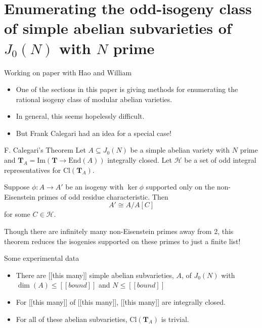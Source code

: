 \documentclass{beamer}
\newcommand{\TT}{\mathbf{T}}
\renewcommand{\H}{\mathcal{H}}
\renewcommand{\Im}{\mathrm{Im}}
\newcommand{\Cl}{\mathrm{Cl}}
\newcommand{\End}{\mathrm{End}}
\begin{document}
\section{Enumerating the odd-isogeny class of simple abelian subvarieties of
$J_0(N)$ with $N$ prime}

\begin{frame}{Working on paper with Hao and William}
    \begin{itemize}
        \item 
            One of the sections in this paper is giving methods for enumerating
            the rational isogeny class of modular abelian varieties. 
        \item
            In general, this seems hopelessly difficult.
        \item
            But Frank Calegari had an idea for a special case!
    \end{itemize} 
\end{frame}

\begin{frame}{F. Calegari's Theorem}
    Let $A\subseteq J_0(N)$ be a simple abelian variety with $N$ prime and
    $\TT_A = \Im(\TT\to \End(A))$ integrally closed. Let $\H$ be a set of
    odd integral representatives for $\Cl(\TT_A)$.
    \begin{theorem}[F. Calegari]
        Suppose $\phi:A\to A'$ be an isogeny with $\ker\phi$ supported only on the
        non-Eisenstein primes of odd residue characteristic. Then
        \[
            A'\cong A/A[C]
        \]
        for some $C\in \H$.
    \end{theorem}
    Though there are infinitely many non-Eisenstein primes away from 2, this
    theorem reduces the isogenies supported on these primes to just a finite
    list!
\end{frame}

\begin{frame}{Some experimental data}
    \begin{itemize}
        \item 
            There are [[this many]] simple abelian subvarieties, $A$, of
            $J_0(N)$ with $\dim(A)\leq [[bound]]$ and $N\leq [[bound]]$
        \item
            For [[this many]] of [[this many]], [[this many]] are integrally
            closed.
        \item
            For all of these abelian subvarieties, $\Cl(\TT_A)$ is trivial.
    \end{itemize} 
\end{frame}
\end{document}
